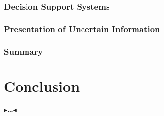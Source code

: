 \documentclass[twoside,11pt,openright]{report}
\newcommand{\todo}[1]{{\color[rgb]{.5,0,0}\textbf{$\blacktriangleright$#1$\blacktriangleleft$}}}
\begin{document}
\subsection{Decision Support Systems}

\subsection{Presentation of Uncertain Information}

\subsection{Summary}


\chapter{Conclusion}
\label{ch:conclusion}

\todo{\dots}



 

\end{document}
